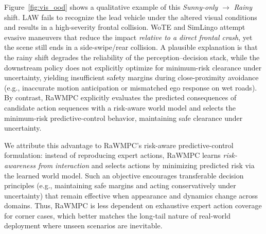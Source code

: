 \documentclass[twocolumn]{template}
\theoremstyle{thmstyleone}%
\theoremstyle{thmstyletwo}%
\theoremstyle{thmstylethree}%
\begin{document}

Figure~\ref{fig:vis_ood} shows a qualitative example of this \textit{Sunny-only} $\rightarrow$ \textit{Rainy} shift.
LAW fails to recognize the lead vehicle under the altered visual conditions and results in a high-severity frontal collision.
WoTE and SimLingo attempt evasive maneuvers that reduce the impact \emph{relative to a direct frontal crash}, yet the scene still ends in a side-swipe/rear collision.
A plausible explanation is that the rainy shift degrades the reliability of the perception--decision stack, while the downstream policy does not explicitly optimize for minimum-risk clearance under uncertainty, yielding insufficient safety margins during close-proximity avoidance (e.g., inaccurate motion anticipation or mismatched ego response on wet roads).
By contrast, RaWMPC explicitly evaluates the predicted consequences of candidate action sequences with a risk-aware world model and selects the minimum-risk predictive-control behavior, maintaining safe clearance under uncertainty.

We attribute this advantage to RaWMPC's risk-aware predictive-control formulation: instead of reproducing expert actions, RaWMPC learns \emph{risk-awareness from interaction} and selects actions by minimizing predicted risk via the learned world model.
Such an objective encourages transferable decision principles (e.g., maintaining safe margins and acting conservatively under uncertainty) that remain effective when appearance and dynamics change across domains.
Thus, RaWMPC is less dependent on exhaustive expert action coverage for corner cases, which better matches the long-tail nature of real-world deployment where unseen scenarios are inevitable.
\end{document}
